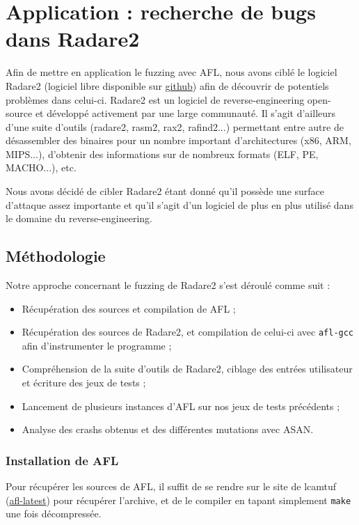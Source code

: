 \chapter{Application : recherche de bugs dans Radare2}

Afin de mettre en application le fuzzing avec AFL, nous avons ciblé le logiciel Radare2 (logiciel libre disponible sur \href{https://github.com/radare/radare2}{github}) afin de découvrir de potentiels problèmes dans celui-ci.
Radare2 est un logiciel de reverse-engineering open-source et développé activement par une large communauté.
Il s'agit d'ailleurs d'une suite d'outils (radare2, rasm2, rax2, rafind2...) permettant entre autre de désassembler des binaires pour un nombre important d'architectures (x86, ARM, MIPS...), d'obtenir des informations sur de nombreux formats (ELF, PE, MACHO...), etc.

Nous avons décidé de cibler Radare2 étant donné qu'il possède une surface d'attaque assez importante et qu'il s'agit d'un logiciel de plus en plus utilisé dans le domaine du reverse-engineering.

\section{Méthodologie}

Notre approche concernant le fuzzing de Radare2 s'est déroulé comme suit :

\begin{itemize}
\item Récupération des sources et compilation de AFL ;
\item Récupération des sources de Radare2, et compilation de celui-ci avec \lstinline{afl-gcc} afin d'instrumenter le programme ;
\item Compréhension de la suite d'outils de Radare2, ciblage des entrées utilisateur et écriture des jeux de tests ;
\item Lancement de plusieurs instances d'AFL sur nos jeux de tests précédents ;
\item Analyse des crashs obtenus et des différentes mutations avec ASAN.
\end{itemize}

\subsection{Installation de AFL}

Pour récupérer les sources de AFL, il suffit de se rendre sur le site de lcamtuf (\href{http://lcamtuf.coredump.cx/afl/releases/afl-latest.tgz}{afl-latest}) pour récupérer l'archive, et de le compiler en tapant simplement \lstinline{make} une fois décompressée.

